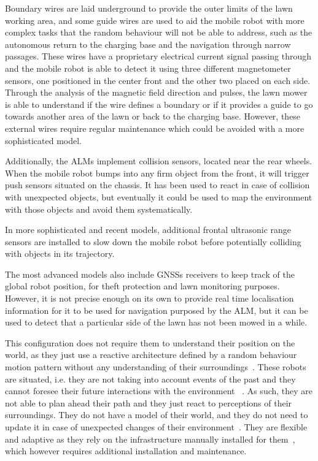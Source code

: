 Boundary wires are laid underground to provide the outer limits of the lawn working area, and some guide wires are used to aid the mobile robot with more complex tasks that the random behaviour will not be able to address, such as the autonomous return to the charging base and the navigation through narrow passages.
These wires have a proprietary electrical current signal passing through and the mobile robot is able to detect it using three different magnetometer sensors, one positioned in the center front and the other two placed on each side.
Through the analysis of the magnetic field direction and pulses, the lawn mower is able to understand if the wire defines a boundary or if it provides a guide to go towards another area of the lawn or back to the charging base.
However, these external wires require regular maintenance which could be avoided with a more sophisticated model.

Additionally, the \glspl{ALM} implement collision sensors, located near the rear wheels.
When the mobile robot bumps into any firm object from the front, it will trigger push sensors situated on the chassis.
It has been used to react in case of collision with unexpected objects, but eventually it could be used to map the environment with those objects and avoid them systematically.

In more sophisticated and recent models, additional frontal ultrasonic range sensors are installed to slow down the mobile robot before potentially colliding with objects in its trajectory.

The most advanced models also include \Glspl{GNSS} receivers to keep track of the global robot position, for theft protection and lawn monitoring purposes.
However, it is not precise enough on its own to provide real time localisation information for it to be used for navigation purposed by the \gls{ALM}, but it can be used to detect that a particular side of the lawn has not been mowed in a while.%

This configuration does not require them to understand their position on the world, as they just use a reactive architecture defined by a random behaviour motion pattern without any understanding of their surroundings~\cite{wooldridge_agent_1995}.
These robots are situated, i.e. they are not taking into account events of the past and they cannot foresee their future interactions with the environment  ~\cite{muller_1999}.
As such, they are not able to plan ahead their path and they just react to perceptions of their surroundings.
They do not have a model of their world, and they do not need to update it in case of unexpected changes of their environment~\cite{wooldridge_agent_1995}.
They are flexible and adaptive as they rely on the infrastructure manually installed for them~\cite{wahde2012introduction},  which however requires additional installation and maintenance.


